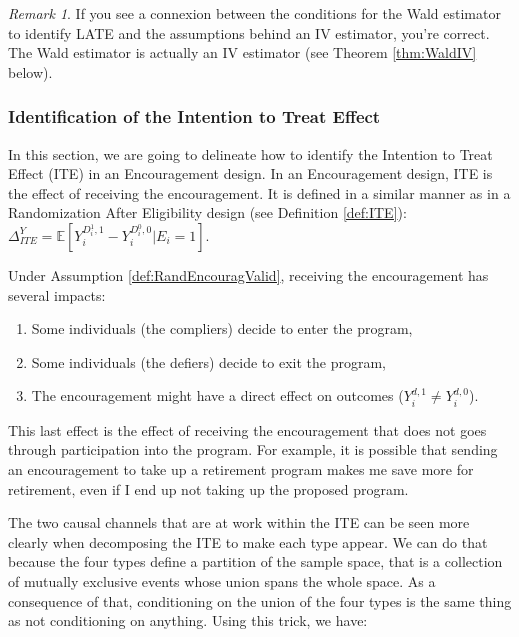 \documentclass[
]{book}
\providecommand{\tightlist}{%
  \setlength{\itemsep}{0pt}\setlength{\parskip}{0pt}}
\newcommand{\esp}[1]{\mathbb{E}[ #1 ]}
\theoremstyle{definition}
\theoremstyle{definition}
\theoremstyle{definition}
\theoremstyle{definition}
\theoremstyle{remark}
\newtheorem*{remark}{Remark}
\begin{document}
\begin{remark}
\iffalse{} {Remark. } \fi{}If you see a connexion between the conditions for the Wald estimator to identify LATE and the assumptions behind an IV estimator, you're correct.
The Wald estimator is actually an IV estimator (see Theorem \ref{thm:WaldIV} below).
\end{remark}

\hypertarget{ITEEncourag}{%
\subsubsection{Identification of the Intention to Treat Effect}\label{ITEEncourag}}

In this section, we are going to delineate how to identify the Intention to Treat Effect (ITE) in an Encouragement design.
In an Encouragement design, ITE is the effect of receiving the encouragement.
It is defined in a similar manner as in a Randomization After Eligibility design (see Definition \ref{def:ITE}): \(\Delta^Y_{ITE} = \esp{Y_i^{D_i^1,1}-Y_i^{D_i^0,0}|E_i=1}\).

Under Assumption \ref{def:RandEncouragValid}, receiving the encouragement has several impacts:

\begin{enumerate}
\def\labelenumi{\arabic{enumi}.}
\tightlist
\item
  Some individuals (the compliers) decide to enter the program,
\item
  Some individuals (the defiers) decide to exit the program,
\item
  The encouragement might have a direct effect on outcomes (\(Y_i^{d,1}\neq Y_i^{d,0}\)).
\end{enumerate}

This last effect is the effect of receiving the encouragement that does not goes through participation into the program.
For example, it is possible that sending an encouragement to take up a retirement program makes me save more for retirement, even if I end up not taking up the proposed program.

The two causal channels that are at work within the ITE can be seen more clearly when decomposing the ITE to make each type appear.
We can do that because the four types define a partition of the sample space, that is a collection of mutually exclusive events whose union spans the whole space.
As a consequence of that, conditioning on the union of the four types is the same thing as not conditioning on anything.
Using this trick, we have:
\end{document}

